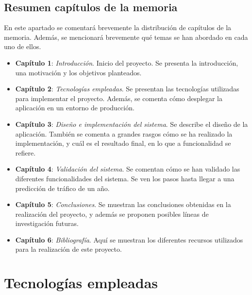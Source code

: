 \documentclass[a4paper, oneside, 12pt]{book}
\begin{document}
	\section{Resumen capítulos de la memoria}
	
	\noindent En este apartado se comentará brevemente la distribución de capítulos de la memoria. Además, se mencionará brevemente qué temas se han abordado en cada uno de ellos. \\
	
	\begin{itemize}
		\item \textbf{Capítulo 1}: \textit{Introducción}. Inicio del proyecto. Se presenta la introducción, una motivación y los objetivos planteados. \\
		
		\item \textbf{Capítulo 2}: \textit{Tecnologías empleadas}. Se presentan las tecnologías utilizadas para implementar el proyecto. Además, se comenta cómo desplegar la aplicación en un entorno de producción. \\
		
		\pagebreak
		
		\item \textbf{Capítulo 3}: \textit{Diseño e implementación del sistema}. Se describe el diseño de la aplicación. También se comenta a grandes rasgos cómo se ha realizado la implementación, y cuál es el resultado final, en lo que a funcionalidad se refiere. \\
		
		\item \textbf{Capítulo 4}: \textit{Validación del sistema}. Se comentan cómo se han validado las diferentes funcionalidades del sistema. Se ven los pasos hasta llegar a una predicción de tráfico de un año. \\
		
		\item \textbf{Capítulo 5}: \textit{Conclusiones}. Se muestran las conclusiones obtenidas en la realización del proyecto, y además se proponen posibles líneas de investigación futuras. \\
		
		\item \textbf{Capítulo 6}: \textit{Bibliografía}. Aquí se muestran los diferentes recursos utilizados para la realización de este proyecto.
	\end{itemize}
	
	\pagebreak
	
	\chapter{Tecnologías empleadas}
	
\end{document}
